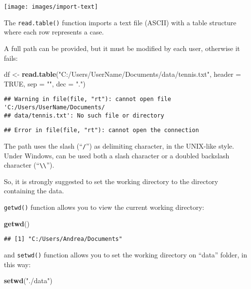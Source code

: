 \documentclass[]{book}
\newenvironment{Shaded}{\begin{snugshade}}{\end{snugshade}}
\newcommand{\KeywordTok}[1]{\textcolor[rgb]{0.13,0.29,0.53}{\textbf{{#1}}}}
\newcommand{\DataTypeTok}[1]{\textcolor[rgb]{0.13,0.29,0.53}{{#1}}}
\newcommand{\StringTok}[1]{\textcolor[rgb]{0.31,0.60,0.02}{{#1}}}
\newcommand{\OtherTok}[1]{\textcolor[rgb]{0.56,0.35,0.01}{{#1}}}
\newcommand{\NormalTok}[1]{{#1}}
\begin{document}
\texttt{[image: images/import-text]}

The \texttt{read.table()} function imports a text file (ASCII) with a
table structure where each row represents a case.

A full path can be provided, but it must be modified by each user,
otherwise it fails:

\begin{Shaded}
\begin{Highlighting}[]
\NormalTok{df <-}\StringTok{ }\KeywordTok{read.table}\NormalTok{(}\StringTok{"C:/Users/UserName/Documents/data/tennis.txt"}\NormalTok{, }\DataTypeTok{header =} \OtherTok{TRUE}\NormalTok{, }\DataTypeTok{sep =} \StringTok{""}\NormalTok{, }\DataTypeTok{dec =} \StringTok{"."}\NormalTok{)}
\end{Highlighting}
\end{Shaded}

\begin{verbatim}
## Warning in file(file, "rt"): cannot open file 'C:/Users/UserName/Documents/
## data/tennis.txt': No such file or directory
\end{verbatim}

\begin{verbatim}
## Error in file(file, "rt"): cannot open the connection
\end{verbatim}

The path uses the slash (``\texttt{/}'') as delimiting character, in the
UNIX-like style. Under Windows, can be used both a slash character or a
doubled backslash character
(``\texttt{\textbackslash{}\textbackslash{}}'').

So, it is strongly suggested to set the working directory to the
directory containing the data.

\texttt{getwd()} function allows you to view the current working
directory:

\begin{Shaded}
\begin{Highlighting}[]
\KeywordTok{getwd}\NormalTok{() }
\end{Highlighting}
\end{Shaded}

\begin{verbatim}
## [1] "C:/Users/Andrea/Documents"
\end{verbatim}

and \texttt{setwd()} function allows you to set the working directory on
``data'' folder, in this way:

\begin{Shaded}
\begin{Highlighting}[]
\KeywordTok{setwd}\NormalTok{(}\StringTok{"./data"}\NormalTok{) }
\end{Highlighting}
\end{Shaded}
\end{document}
